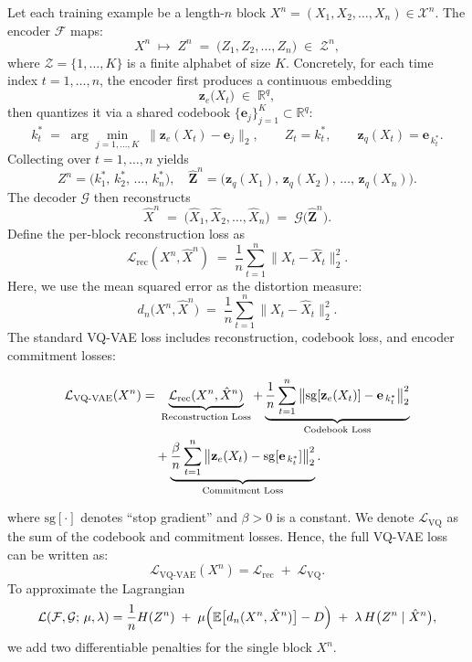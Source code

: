\documentclass[12pt,review,authoryear]{elsarticle}
\theoremstyle{upright}
\begin{document}
Let each training example be a length-\(n\) block \(X^n = (X_1, X_2, \dots, X_n)\in\mathcal{X}^n\).  The encoder \(\mathcal{F}\) maps:
\[
X^n \;\mapsto\; Z^n \;=\; \bigl(Z_1, Z_2, \dots, Z_n\bigr)\;\in\;\mathcal{Z}^n,
\]
where \(\mathcal{Z}=\{1,\dots,K\}\) is a finite alphabet of size \(K\).  Concretely, for each time index \(t=1,\dots,n\), the encoder first produces a continuous embedding
\[
\mathbf{z}_e\bigl(X_t\bigr)\;\in\;\mathbb{R}^q,
\]
then quantizes it via a shared codebook \(\{\mathbf{e}_j\}_{j=1}^K\subset\mathbb{R}^q\):
\[
k_t^*
\;=\;
\arg\min_{j=1,\dots,K}\;\bigl\lVert \mathbf{z}_e(X_t) - \mathbf{e}_j \bigr\rVert_2,
\qquad
Z_t = k_t^*,
\qquad
\mathbf{z}_q(X_t) = \mathbf{e}_{\,k_t^*}.
\]
Collecting over \(t=1,\dots,n\) yields
\[
Z^n = \bigl(k_1^*,\,k_2^*,\,\dots,\,k_n^*\bigr),
\quad
\hat{\mathbf{Z}}^n = \bigl(\mathbf{z}_q(X_1),\,\mathbf{z}_q(X_2),\,\dots,\,\mathbf{z}_q(X_n)\bigr).
\]
The decoder \(\mathcal{G}\) then reconstructs
\[
\hat{X}^n 
\;=\; 
\bigl(\hat{X}_1,\hat{X}_2,\dots,\hat{X}_n\bigr)
\;=\; 
\mathcal{G}\bigl(\hat{\mathbf{Z}}^n\bigr).
\]
Define the per‐block reconstruction loss as
\[
\mathcal{L}_{\mathrm{rec}}(X^n,\hat{X}^n)
\;=\;
\frac{1}{n}\sum_{t=1}^n \bigl\lVert X_t - \hat{X}_t \bigr\rVert_2^2.
\]
Here, we use the mean squared error as the distortion measure:
\[
d_n\bigl(X^n,\hat{X}^n\bigr)
\;=\;
\frac{1}{n}\sum_{t=1}^n \bigl\lVert X_t - \hat{X}_t \bigr\rVert_2^2.
\]
The standard VQ-VAE loss includes reconstruction, codebook loss, and encoder commitment losses:

\begin{align}
\mathcal{L}_{\mathrm{VQ\text{-}VAE}}(X^n)
= &\ \underbrace{\mathcal{L}_{\mathrm{rec}}(X^n,\hat{X}^n)}_{\text{Reconstruction Loss}} 
+ \underbrace{\frac{1}{n}\sum_{t=1}^n \left\lVert \mathrm{sg}[\mathbf{z}_e(X_t)] - \mathbf{e}_{\,k_t^*} \right\rVert_2^2}_{\text{Codebook Loss}} \notag \\
& + \underbrace{\frac{\beta}{n}\sum_{t=1}^n \left\lVert \mathbf{z}_e(X_t) - \mathrm{sg}[\mathbf{e}_{\,k_t^*}] \right\rVert_2^2}_{\text{Commitment Loss}}.
\end{align}


\noindent where \(\mathrm{sg}[\cdot]\) denotes “stop gradient” and \(\beta>0\) is a constant. We denote \(\mathcal{L}_{\mathrm{VQ}}\) as the sum of the codebook and commitment losses.  Hence, the full VQ-VAE loss can be written as:
\[
\mathcal{L}_{\mathrm{VQ\text{-}VAE}}(X^n)
=
\mathcal{L}_{\mathrm{rec}}
\;+\;\mathcal{L}_{\mathrm{VQ}}.
\]
To approximate the Lagrangian
\[
\mathcal{L}(\mathcal{F},\mathcal{G};\,\mu,\lambda)
=\frac{1}{n}H(Z^n)
\;+\;
\mu\Bigl(\mathbb{E}\bigl[d_n(X^n,\hat{X}^n)\bigr]-D\Bigr)
\;+\;
\lambda\,H\bigl(Z^n\mid\hat{X}^n\bigr),
\]
we add two differentiable penalties for the single block \(X^n\).
\end{document}
